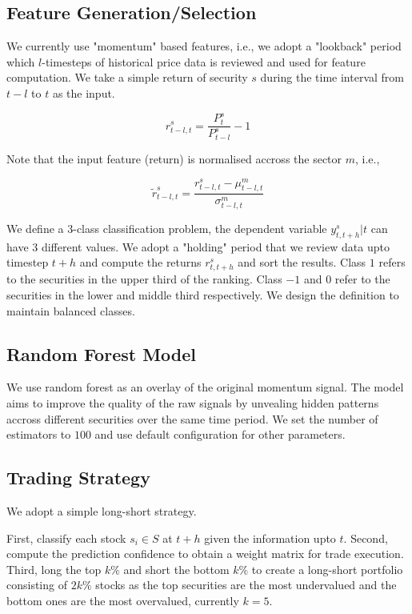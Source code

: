 \documentclass[12pt]{article}
\begin{document}
\subsection{Feature Generation/Selection}

We currently use "momentum" based features, i.e., we adopt a "lookback" period which $l$-timesteps of historical price data is reviewed and used for feature computation. We take a simple return of security $s$ during the time interval from $t-l$ to $t$ as the input.

$$r_{t-l, t}^s = \frac{P_t^s}{P_{t-l}^s}-1$$

Note that the input feature (return) is normalised accross the sector $m$, i.e.,

$$\tilde{r}_{t-l, t}^s = \frac{r_{t-l, t}^s-\mu_{t-l, t}^m}{\sigma_{t-l, t}^m}$$

We define a 3-class classification problem, the dependent variable $y_{t, t+h}^s|t$ can have 3 different values. We adopt a "holding" period that we review data upto timestep $t+h$ and compute the returns $r_{t, t+h}^s$ and sort the results. Class $1$ refers to the securities in the upper third of the ranking. Class $-1$ and $0$ refer to the securities in the lower and middle third respectively. We design the definition to maintain balanced classes.

\subsection{Random Forest Model}

We use random forest as an overlay of the original momentum signal. The model aims to improve the quality of the raw signals by unvealing hidden patterns accross different securities over the same time period. We set the number of estimators to $100$ and use default configuration for other parameters.

\subsection{Trading Strategy}

We adopt a simple long-short strategy.

First, classify each stock $s_i \in S$ at $t+h$ given the information upto $t$. Second, compute the prediction confidence to obtain a weight matrix for trade execution. Third, long the top $k\%$ and short the bottom $k\%$ to create a long-short portfolio consisting of $2k\%$ stocks as the top securities are the most undervalued and the bottom ones are the most overvalued, currently $k = 5$.
\end{document}
